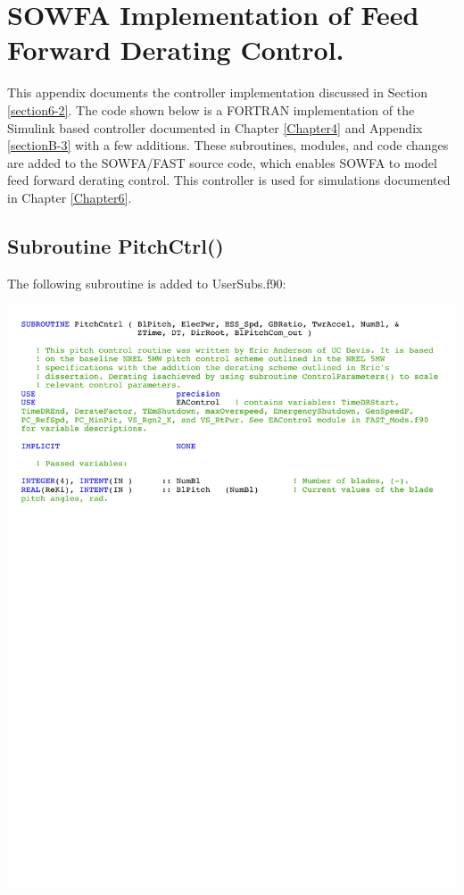 
\chapter{SOWFA Implementation of Feed Forward Derating Control.} %

\label{AppendixD} %

This appendix documents the controller implementation discussed in Section \ref{section6-2}. The code shown below is a FORTRAN implementation of the Simulink based controller documented in Chapter \ref{Chapter4} and Appendix \ref{sectionB-3} with a few additions.  These subroutines, modules, and code changes are added to the SOWFA/FAST source code, which enables SOWFA to model feed forward derating control. This controller is used for simulations documented in Chapter \ref{Chapter6}.




\section{Subroutine PitchCtrl()} \label{sectionD-1}
The following subroutine is added to UserSubs.f90:

\noindent
\includegraphics[width=\linewidth]{Figures/AppendixDFigures/figD-1A.pdf}

